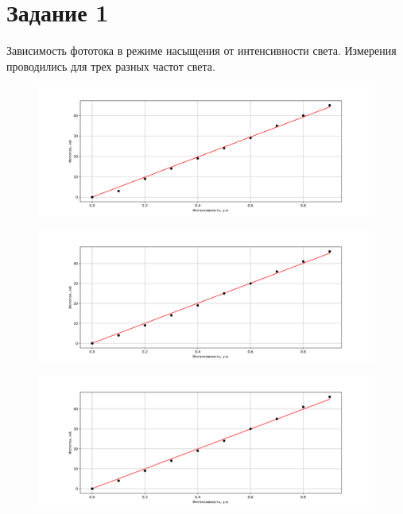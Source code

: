 \section{Задание 1}
Зависимость фототока в режиме насыщения от интенсивности света. Измерения проводились для трех разных
частот света.
\begin{center}
	\begin{figure}[H]
		\vspace{-20pt}	
        \includegraphics[width=\linewidth]{graphs/1500} 
        \vspace{-10pt}
        \label{fig:3}
	\end{figure}
	\begin{figure}[H]
		\vspace{-20pt}
        \includegraphics[width=\linewidth]{graphs/2000} 
        \vspace{-10pt}
        \label{fig:4}
    \end{figure}
    \begin{figure}[H]
        \vspace{-20pt}
		\includegraphics[width=\linewidth]{graphs/2500} 
        \vspace{-10pt}
        \label{fig:3}
    \end{figure}
\end{center}
